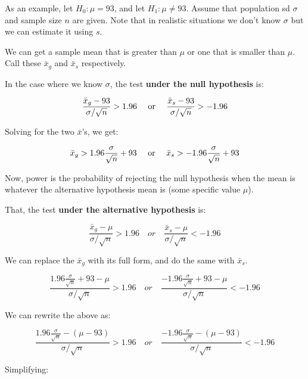 \documentclass[12pt]{book}\usepackage[]{graphicx}\usepackage[]{color}
\begin{document}
As an example, let $H_0: \mu = 93$, and let $H_1: \mu \neq 93$. Assume that population sd $\sigma$ and sample size $n$ are given. Note that in realistic situations we don't know $\sigma$ but we can estimate it using $s$.

We can get a sample mean that is greater than $\mu$ or one that is smaller than $\mu$. Call these $\bar{x}_g$ and $\bar{x}_s$ respectively. 

In the case where we know $\sigma$, the test \textbf{under the null hypothesis} is:

\begin{equation}
\frac{\bar{x}_g-93}{\sigma / \sqrt{n}} > 1.96
\quad \hbox{ or }
\quad
\frac{\bar{x}_s-93}{\sigma / \sqrt{n}} > -1.96
\end{equation}

Solving for the two $\bar{x}$'s, we get:

\begin{equation}
\bar{x}_g > 1.96\frac{\sigma}{\sqrt{n}} + 93  
\quad \hbox{ or }
\quad
\bar{x}_s > -1.96\frac{\sigma}{\sqrt{n}} + 93  
\end{equation}

Now, power is the probability of rejecting the null hypothesis when the mean is whatever the alternative hypothesis mean is (some specific value $\mu$).

That, the test \textbf{under the alternative hypothesis} is:

\begin{equation}
\frac{\bar{x}_g - \mu}{\sigma / \sqrt{n}} > 1.96 
\quad
or 
\quad 
\frac{\bar{x}_s - \mu}{\sigma / \sqrt{n}} < -1.96 
\end{equation}

We can replace the $\bar{x}_g$ with its full form, and do the same with $\bar{x}_s$.

\begin{equation}
\frac{1.96\frac{\sigma}{\sqrt{n}} + 93 - \mu}{\sigma / \sqrt{n}} > 1.96 
\quad
or 
\quad 
\frac{-1.96\frac{\sigma}{\sqrt{n}} + 93 - \mu}{\sigma / \sqrt{n}} < -1.96 
\end{equation}

We can rewrite the above as:

\begin{equation}
\frac{1.96\frac{\sigma}{\sqrt{n}} - (\mu - 93)}{\sigma / \sqrt{n}} > 1.96 
\quad
or 
\quad 
\frac{-1.96\frac{\sigma}{\sqrt{n}} - (\mu - 93)}{\sigma / \sqrt{n}} < -1.96 
\end{equation}

Simplifying:
\end{document}
